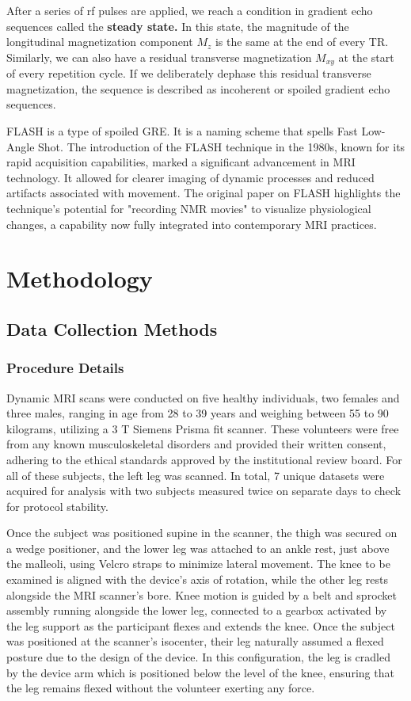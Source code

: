 \documentclass{micro-econ-thesis}
\begin{document}
After a series of rf pulses are applied, we reach a condition in gradient echo sequences called the \textbf{steady state.} In this state, the magnitude of the longitudinal magnetization component $M_z$ is the same at the end of every TR. Similarly, we can also have a residual transverse magnetization $M_{xy}$ at the start of every repetition cycle. If we deliberately dephase this residual transverse magnetization, the sequence is described as incoherent or spoiled gradient echo sequences.

FLASH is a type of spoiled GRE. It is a naming scheme that spells Fast Low-Angle Shot. \parencite{haase_flash_1986} The introduction of the FLASH technique in the 1980s, known for its rapid acquisition capabilities, marked a significant advancement in MRI technology. It allowed for clearer imaging of dynamic processes and reduced artifacts associated with movement. The original paper on FLASH highlights the technique's potential for "recording NMR movies" to visualize physiological changes, a capability now fully integrated into contemporary MRI practices.

\section{Methodology}
\label{sec:second}

\subsection{Data Collection Methods}

\subsubsection{Procedure Details}
Dynamic MRI scans were conducted on five healthy individuals, two females and three males, ranging in age from 28 to 39 years and weighing between 55 to 90 kilograms, utilizing a 3 T Siemens Prisma fit scanner. These volunteers were free from any known musculoskeletal disorders and provided their written consent, adhering to the ethical standards approved by the institutional review board. For all of these subjects, the left leg was scanned. In total, 7 unique datasets were acquired for analysis with two subjects measured twice on separate days to check for protocol stability. 


Once the subject was positioned supine in the scanner, the thigh was secured on a wedge positioner, and the lower leg was attached to an ankle rest, just above the malleoli, using Velcro straps to minimize lateral movement. The knee to be examined is aligned with the device’s axis of rotation, while the other leg rests alongside the MRI scanner's bore.  Knee motion is guided by a belt and sprocket assembly running alongside the lower leg, connected to a gearbox activated by the leg support as the participant flexes and extends the knee. Once the subject was positioned at the scanner's isocenter, their leg naturally assumed a flexed posture due to the design of the device. In this configuration, the leg is cradled by the device arm which is positioned below the level of the knee, ensuring that the leg remains flexed without the volunteer exerting any force.
\end{document}
